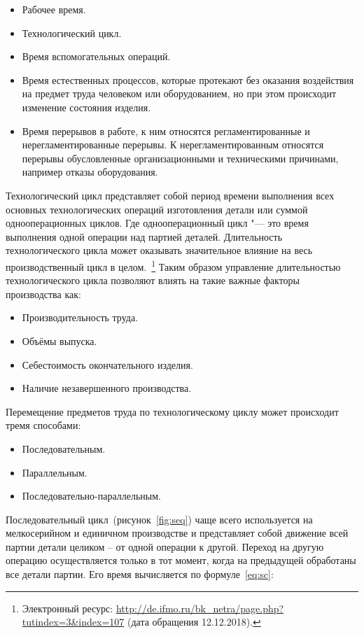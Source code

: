 \begin{itemize}
	\item Рабочее время.
	\item Технологический цикл.
	\item Время вспомогательных операций.
	\item Время естественных процессов, которые протекают без оказания воздействия на предмет труда человеком или оборудованием, но при этом происходит изменение состояния изделия.
	\item Время перерывов в работе, к ним относятся регламентированные и нерегламентированные перерывы. К нерегламентированным относятся перерывы обусловленные организационными и техническими причинами, например отказы оборудования.
\end{itemize}

Технологический цикл представляет собой период времени выполнения  всех основных технологических операций изготовления детали или суммой однооперационных циклов. Где однооперационный цикл "--- это время выполнения одной операции над партией деталей. Длительность технологического цикла может оказывать значительное влияние на весь производственный цикл в целом.~\footnote{Электронный ресурс: {\tiny\url{http://de.ifmo.ru/bk_netra/page.php?tutindex=3&index=107}} (дата обращения 12.12.2018).} Таким образом управление длительностью технологического цикла позволяют влиять на такие важные факторы производства как:

\begin{itemize}
	\item Производительность труда.
	\item Объёмы выпуска.
	\item Себестоимость окончательного изделия.
	\item Наличие незавершенного производства.
\end{itemize}

Перемещение предметов труда по технологическому циклу может происходит тремя способами:

\begin{itemize}
 	\item Последовательным.
	\item Параллельным.
    \item Последовательно-параллельным.
\end{itemize}

Последовательный цикл~(рисунок~\cref{fig:seq}) чаще всего используется на мелкосерийном и единичном производстве и представляет собой движение всей партии детали целиком -- от одной операции к другой. Переход на другую операцию осуществляется только в тот момент, когда на предыдущей обработаны все детали партии.
Его время вычисляется по формуле~\cref{eq:sc}:

